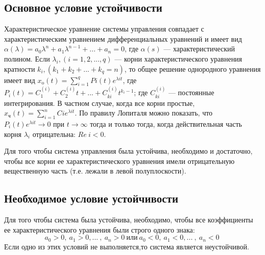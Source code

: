 \documentclass[../../TAU.tex]{subfiles}
\begin{document}
\subsection{Основное условие устойчивости}

    Характеристическое уравнение системы управления совпадает с характеристическим уравнением дифференциальных уравнений и имеет вид
    $\alpha(\lambda)=a_0\lambda^n+a_1\lambda^{n-1}+...+a_n=0$, 
    где $\alpha(s)$ --- 
    характеристический полином. Если 
    $\lambda_i, (i=1,2,...,q)$ ---
    корни характеристического уравнения кратности
    $k_i, (k_1+k_2+...+k_q=n)$, 
    то общее решение однородного уравнения имеет вид 
    $x_\text{o}(t)=\sum_{i=1}^q{Pi(t) e^{\lambda i t}}$, 
    где 
    $P_i(t)=C_1^{(i)}+C_2^{(i)} t+...+C_{ki}^{(i)} t^{k_i-1}$; 
    где 
    $C_{ki}^{(i)}$ --- постоянные   интегрирования. 
    В частном случае, когда все корни простые, 
    $x_\text{ч}(t)=\sum_{i=1}^nCi e^{\lambda i t}$. 
    По правилу Лопиталя можно показать, что 
    $P_i(t) e^{\lambda i t}\rightarrow 0 $
    при 
    $t\rightarrow\infty$ 
    тогда и только тогда, когда действительная часть корня 
    $\lambda_i$
    отрицательна: 
    $Re\ {i}<0$. 

     Для того чтобы система управления была устойчива, необходимо и достаточно, чтобы все корни ее характеристического уравнения имели отрицательную вещественную часть (т.е. лежали в левой полуплоскости). 

\subsection{Необходимое условие устойчивости}

     Для того чтобы система была устойчива, необходимо, чтобы все коэффициенты ее характеристического уравнения были строго одного знака: 
    $$
        a_0>0,\ a_1>0, ...\ ,\ a_n>0\ \text{или}\ a_0<0,\ a_1<0, ...\ ,\ a_n<0\
    $$
    Если одно из этих условий не выполняется,то система является неустойчивой.
\end{document}
